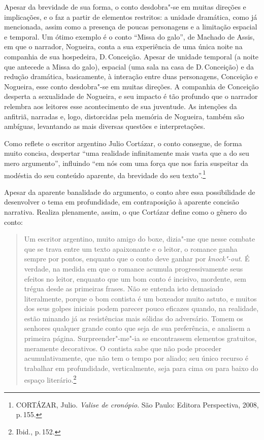 Apesar da brevidade de sua forma, o conto desdobra"-se em muitas direções e implicações, e o faz a partir de elementos restritos: a unidade dramática, como já mencionada, assim como a presença de poucas personagens e a limitação espacial e temporal. Um ótimo exemplo é o conto ``Missa do galo'', de Machado de Assis, em que o narrador, Nogueira, conta a sua experiência de uma única noite na companhia de sua hospedeira, D.\,Conceição. Apesar de unidade temporal (a noite que antecede a Missa do galo), espacial (uma sala na casa de D.\,Conceição) e da redução dramática, basicamente, à interação entre duas personagens, Conceição e Nogueira, esse conto desdobra"-se em muitas direções. A companhia de Conceição desperta a sexualidade de Nogueira, e seu impacto é tão profundo que o narrador relembra aos leitores esse acontecimento de sua juventude. As intenções da anfitriã, narradas e, logo, distorcidas pela memória de Nogueira, também são ambíguas, levantando as mais diversas questões e interpretações.

Como reflete o escritor argentino Julio Cortázar, o conto consegue, de forma muito concisa, despertar ``uma realidade infinitamente mais vasta que a do seu mero argumento'', influindo ``em nós com uma força que nos faria suspeitar da modéstia do seu conteúdo aparente, da brevidade do seu texto''.\footnote{\textsc{CORTÁZAR}, Julio. \textit{Valise de cronópio}. São Paulo: Editora Perspectiva, 2008, p.\,155.}

Apesar da aparente banalidade do argumento, o conto abre essa possibilidade de desenvolver o tema em profundidade, em contraposição à aparente concisão narrativa. Realiza plenamente, assim, o que Cortázar define como o gênero do conto:

\begin{quote}
Um escritor argentino, muito amigo do boxe, dizia"-me que nesse combate que se trava entre um texto apaixonante e o leitor, o romance ganha sempre por pontos, enquanto que o conto deve ganhar por \textit{knock"-out}. É verdade, na medida em que o romance acumula progressivamente seus efeitos no leitor, enquanto que um bom conto é incisivo, mordente, sem trégua desde as primeiras frases. Não se entenda isto demasiado literalmente, porque o bom contista é um boxeador muito astuto, e muitos dos seus golpes iniciais podem parecer pouco eficazes quando, na realidade, estão minando já as resistências mais sólidas do adversário.
Tomem os senhores qualquer grande conto que seja de sua preferência, e analisem a primeira página. Surpreender"-me"-ia se encontrassem elementos gratuitos, meramente decorativos. O contista sabe que não pode proceder acumulativamente, que não tem o tempo por aliado; seu único recurso é trabalhar em profundidade, verticalmente, seja para cima ou para baixo do espaço literário.\footnote{Ibid., p.\,152.}
\end{quote}

